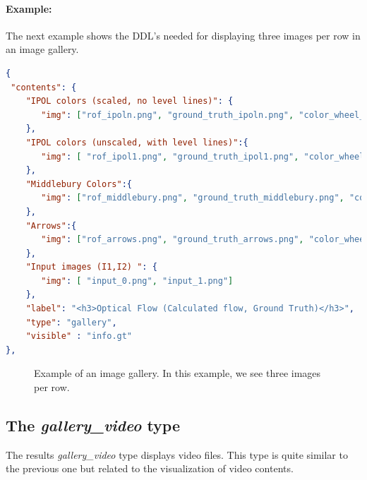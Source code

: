\paragraph{Example:}
The next example shows the DDL's needed for displaying three images per row in an image gallery.
\begin{lstlisting}[language=json,firstnumber=1]
{
 "contents": {
    "IPOL colors (scaled, no level lines)": {
       "img": ["rof_ipoln.png", "ground_truth_ipoln.png", "color_wheel_ipoln.png"]
    },
    "IPOL colors (unscaled, with level lines)":{
       "img": [ "rof_ipol1.png", "ground_truth_ipol1.png", "color_wheel_ipol1.png"]
    },
    "Middlebury Colors":{
       "img": ["rof_middlebury.png", "ground_truth_middlebury.png", "color_wheel_middlebury.png"]
    },
    "Arrows":{
       "img": ["rof_arrows.png", "ground_truth_arrows.png", "color_wheel_arrows.png"]
    },
    "Input images (I1,I2) ": {
       "img": [ "input_0.png", "input_1.png"]
    },
    "label": "<h3>Optical Flow (Calculated flow, Ground Truth)</h3>", 
    "type": "gallery",
    "visible" : "info.gt"
},
\end{lstlisting}

\begin{figure}[h]
\centering
{}
\caption{Example of an image gallery. In this example, we see three images per row.}
\label{fig:image_gallery_example}
\end{figure}

\subsection{The \emph{gallery\_video} type}

The results \emph{gallery\_video} type displays video files. This type is quite similar to the previous one but related to the visualization of video contents.

